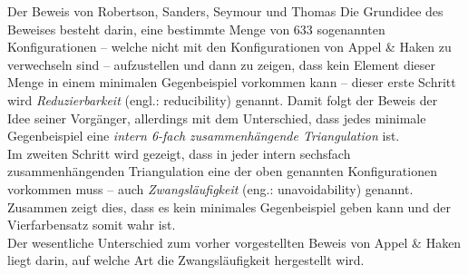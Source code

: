 \begin{chapter}{Der Beweis von Robertson, Sanders, Seymour und Thomas}
  Die Grundidee des Beweises besteht darin, eine bestimmte Menge von 633 sogenannten Konfigurationen -- welche nicht mit den Konfigurationen von Appel \& Haken zu verwechseln sind -- aufzustellen und dann zu zeigen, dass kein Element dieser Menge in einem minimalen Gegenbeispiel vorkommen kann -- dieser erste Schritt wird \textit{Reduzierbarkeit} (engl.: reducibility) genannt. Damit folgt der Beweis der Idee seiner Vorgänger, allerdings mit dem Unterschied, dass jedes minimale Gegenbeispiel eine \textit{intern 6-fach zusammenhängende Triangulation} ist. \\
  Im zweiten Schritt wird gezeigt, dass in jeder intern sechsfach zusammenhängenden Triangulation eine der oben genannten Konfigurationen vorkommen muss -- auch \textit{Zwangsläufigkeit} (eng.: unavoidability) genannt. Zusammen zeigt dies, dass es kein minimales Gegenbeispiel geben kann und der Vierfarbensatz somit wahr ist. \\
  Der wesentliche Unterschied zum vorher vorgestellten Beweis von Appel \& Haken liegt darin, auf welche Art die Zwangsläufigkeit hergestellt wird.
  
  
  
  
\end{chapter}
